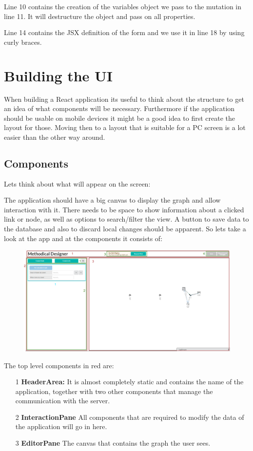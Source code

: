 Line 10 contains the creation of the variables object we pass to the mutation in line 11. It will destructure the object and pass on all properties.

Line 14 contains the JSX definition of the form and we use it in line 18 by using curly braces.

\section{Building the UI}
When building a React application its useful to think about the structure to get an idea of what components will be necessary. Furthermore if the application should be usable on mobile devices it might be a good idea to first create the layout for those. Moving then to a layout that is suitable for a PC screen is a lot easier than the other way around.

\subsection{Components}
Lets think about what will appear on the screen:

The application should have a big canvas to display the graph and allow interaction with it. There needs to be space to show information about a clicked link or node, as well as options to search/filter the view. A button to save data to the database and also to discard local changes should be apparent. So lets take a look at the app and at the components it consists of:
\begin{figure}[H]
\includegraphics[scale=.46]{Bilder/Layout.png}
\end{figure}
The top level components in red are:
\begin{itemize}
\item[1] \textbf{HeaderArea:} It is almost completely static and contains the name of the application, together with two other components that manage the communication with the server.
\item[2] \textbf{InteractionPane} All components that are required to modify the data of the application will go in here.
\item[3] \textbf{EditorPane} The canvas that contains the graph the user sees.
\end{itemize}

